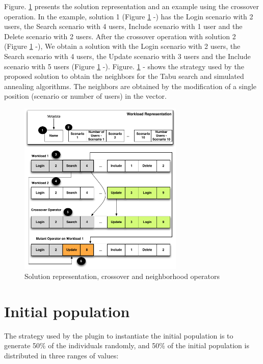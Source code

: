\documentclass[espaco=umemeio,chapter=TITLE,twoside,openright]{abnt}
\begin{document}
Figure. \ref{fig:solution} presents the solution representation and an example using the crossover operation. In the example, solution 1 (Figure \ref{fig:solution}  -) has the Login scenario with 2 users, the Search scenario with 4 users, Include scenario with 1 user and the Delete scenario with 2 users.  After the crossover operation with solution 2 (Figure \ref{fig:solution}  -), We obtain a solution with the Login scenario with 2 users, the Search scenario with 4 users, the Update scenario with 3 users and the Include scenario with 5 users (Figure \ref{fig:solution}  -). Figure. \ref{fig:solution} - shows the strategy used by the proposed solution to  obtain the neighbors for the Tabu search and simulated annealing algorithms. The neighbors are obtained by the modification of a single position (scenario or number of users) in the vector.

\begin{figure}[h]
\centering
\includegraphics[width=0.7\textwidth]{./images/genomere.png}
\caption{Solution representation, crossover  and neighborhood operators \cite{Gois2016}}
\label{fig:solution}
\end{figure}

\section{Initial population}

The strategy used by the plugin to instantiate the initial population is to generate 50\% of the individuals randomly, and 50\% of the initial population is distributed in three ranges of values:
\end{document}
